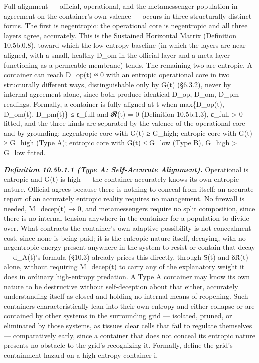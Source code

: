 \documentclass[
]{article}
\begin{document}
Full alignment --- official, operational, and the metamessenger
population in agreement on the container's own valence --- occurs in
three structurally distinct forms. The first is negentropic: the
operational core is negentropic and all three layers agree, accurately.
This is the Sustained Horizontal Matrix (Definition 10.5b.0.8), toward
which the low-entropy baseline (in which the layers are near-aligned,
with a small, healthy D\_om in the official layer and a meta-layer
functioning as a permeable membrane) tends. The remaining two are
entropic. A container can reach D\_op(t) ≈ 0 with an entropic
operational core in two structurally different ways, distinguishable
only by G(t) (§6.3.2), never by internal agreement alone, since both
produce identical D\_op, D\_om, D\_pm readings. Formally, a container is
fully aligned at t when max\{D\_op(t), D\_om(t), D\_pm(t)\} ≤ ε\_full
and 𝓡(t) = 0 (Definition 10.5b.1.3), ε\_full \textgreater{} 0 fitted,
and the three kinds are separated by the valence of the operational core
and by grounding: negentropic core with G(t) ≥ G\_high; entropic core
with G(t) ≥ G\_high (Type A); entropic core with G(t) ≤ G\_low (Type B),
G\_high \textgreater{} G\_low fitted.

\emph{\textbf{Definition 10.5b.1.1 (Type A: Self-Accurate Alignment).}}
Operational is entropic and G(t) is high --- the container accurately
knows its own entropic nature. Official agrees because there is nothing
to conceal from itself: an accurate report of an accurately entropic
reality requires no management. No firewall is needed, M\_decep(t) → 0,
and metamessengers require no split composition, since there is no
internal tension anywhere in the container for a population to divide
over. What contracts the container's own adaptive possibility is not
concealment cost, since none is being paid; it is the entropic nature
itself, decaying, with no negentropic energy present anywhere in the
system to resist or contain that decay --- d\_A(t)'s formula (§10.3)
already prices this directly, through S̃(t) and δR̃(t) alone, without
requiring M\_decep(t) to carry any of the explanatory weight it does in
ordinary high-entropy predation. A Type A container may know its own
nature to be destructive without self-deception about that either,
accurately understanding itself as closed and holding no internal means
of reopening. Such containers characteristically lean into their own
entropy and either collapse or are contained by other systems in the
surrounding grid --- isolated, pruned, or eliminated by those systems,
as tissues clear cells that fail to regulate themselves ---
comparatively early, since a container that does not conceal its
entropic nature presents no obstacle to the grid's recognizing it.
Formally, define the grid's containment hazard on a high-entropy
container i,
\end{document}
